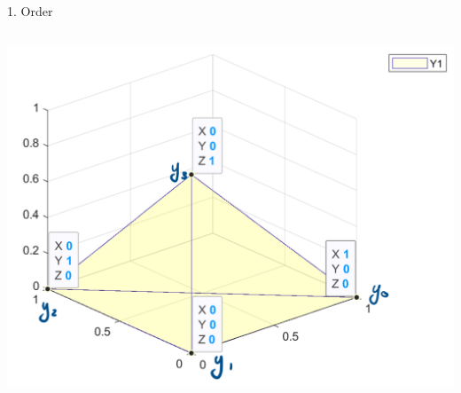 \documentclass{beamer}
\begin{document}
\begin{frame}{1. Order}
\begin{columns}
\begin{column}{0.59\linewidth}
		\includegraphics[width=0.95\linewidth]{Order1Fig}
	\end{column}
	\end{columns}
\end{frame}
\end{document}
